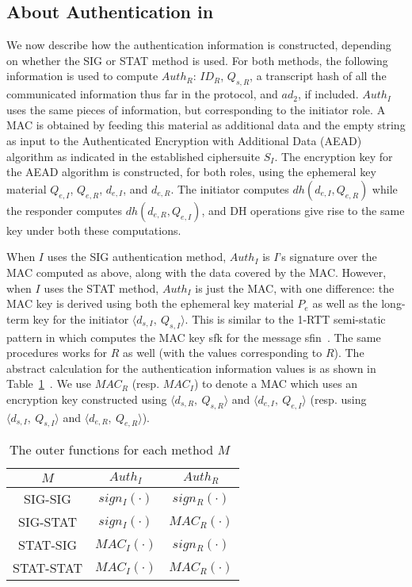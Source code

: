 \documentclass[runningheads]{llncs}
\newcommand{\mConstStyle}[1]{\textsf{#1}}
\newcommand{\mMethodStyle}[1]{\mConstStyle{#1}}
\newcommand{\mProtocolStyle}[1]{\text{#1}}
\newcommand{\mEdhoc}{\mProtocolStyle{EDHOC}}
\newcommand{\mOptls}{\mProtocolStyle{OPTLS}}
\newcommand{\mStat}{\mMethodStyle{STAT}}
\newcommand{\mSig}{\mMethodStyle{SIG}}
\newcommand{\mStatStat}{\mMethodStyle{STAT-STAT}}
\newcommand{\mStatSig}{\mMethodStyle{STAT-SIG}}
\newcommand{\mSigStat}{\mMethodStyle{SIG-STAT}}
\newcommand{\mSigSig}{\mMethodStyle{SIG-SIG}}
\newcommand{\mSuites}{\ensuremath{S_I}}
\newcommand{\mMethod}{\ensuremath{M}}
\newcommand{\mPriv}[1]{\ensuremath{d_{s,#1}}}
\newcommand{\mPub}[1]{\ensuremath{Q_{s,#1}}}
\newcommand{\mX}{\ensuremath{d_{e,I}}}
\newcommand{\mY}{\ensuremath{d_{e,R}}}
\newcommand{\mGx}{\ensuremath{Q_{e,I}}}
\newcommand{\mGy}{\ensuremath{Q_{e,R}}}
\newcommand{\mGxy}{\ensuremath{P_e}}
\newcommand{\mSign}[1]{\ensuremath{\mathit{sign_{#1}}}}
\newcommand{\mDH}{\ensuremath{\mathit{dh}}}
\newcommand{\mCredr}{\ensuremath{Q_{s,R}}}
\newcommand{\mAuthi}{\ensuremath{\mathit{Auth}_I}}
\newcommand{\mAuthr}{\ensuremath{\mathit{Auth}_R}}
\newcommand{\mADtwo}{\ensuremath{\mathit{ad}_2}}
\newcommand{\mIdcredr}{\ensuremath{ID_R}}
\begin{document}
\subsection{About Authentication in \mEdhoc{}}
\label{sec:edhocauth}
We now describe how the authentication information is constructed,
depending on whether the \mSig{} or \mStat{} method is used.
%
For both methods, the following information is used to compute
\mAuthr{}: \mIdcredr{}, \mCredr{}, a transcript hash of all the communicated
information thus far in the protocol, and \mADtwo{}, if included.
%
\mAuthi{} uses the same pieces of information, but corresponding to the
initiator role.
%
A MAC is obtained by feeding this material as additional data and the empty
string as input to the Authenticated Encryption with Additional Data (AEAD) algorithm as indicated in the established ciphersuite \mSuites{}.
%
The encryption key for the AEAD algorithm is constructed, for both roles,
using the ephemeral key material \mGx{}, \mGy{}, \mX{}, and \mY{}.
%
The initiator computes $\mDH(\mX, \mGy)$ while the responder computes
$\mDH(\mY, \mGx)$, and DH operations give rise to the same key under both
these computations.
%

When $I$ uses the \mSig{} authentication method, \mAuthi{} is $I$'s signature
over the MAC computed as above, along with the data covered by the MAC.
%
However, when $I$ uses the \mStat{} method, \mAuthi{} is just the MAC, with
one difference: the MAC key is derived using both the ephemeral key material
\mGxy{} as well as the long-term key for the initiator
$\langle\mPriv{I},\ \mPub{I}\rangle$.
%
This is similar to the 1-RTT semi-static pattern in \mOptls{} which computes the
MAC key \textsf{sfk} for the message
\textsf{sfin}~\cite{DBLP:conf/eurosp/KrawczykW16}.
%
The same procedures works for $R$ as well (with the values corresponding to
$R$).
%
The abstract calculation for the authentication information values is as shown
in Table~\ref{tab:authvalues}~\cite{Norr21}.
%
We use $\mathit{MAC}_{R}$ (resp. $\mathit{MAC}_{I}$) to denote a MAC
which uses
an encryption key constructed using
$\langle\mPriv{R},\ \mPub{R}\rangle$ and $\langle\mX,\ \mGx\rangle$
(resp. using $\langle\mPriv{I},\ \mPub{I}\rangle$ and $\langle\mY,\
\mGy\rangle$).
%
\begin{table}[ht]
\centering
\begin{tabular}{|c|c|c|}
        \hline
        \mMethod & \mAuthi & \mAuthr\\
        \hline
        \mSigSig{} & $\mSign{I}(\cdot)$ & $\mSign{R}(\cdot)$ \\
        \mSigStat{} & $\mSign{I}(\cdot)$ & $\textit{MAC}_R(\cdot)$\\
        \mStatSig{} & $\textit{MAC}_I(\cdot)$ & $\mSign{R}(\cdot)$\\
        \mStatStat{} & $\textit{MAC}_I(\cdot)$ & $\textit{MAC}_R(\cdot)$\\
        \hline
\end{tabular}
\caption{The outer functions for each method \mMethod{}~\cite{Norr21}}
\label{tab:authvalues}
\end{table}
%
\end{document}
